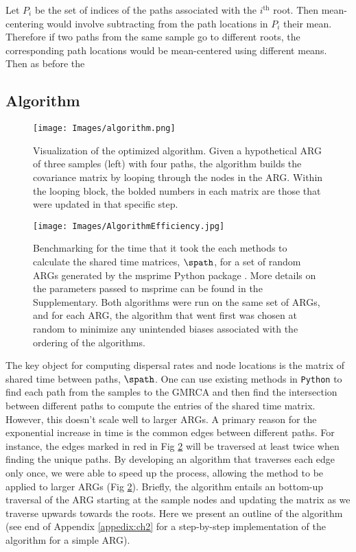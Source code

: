 Let $P_i$ be the set of indices of the paths associated with the $i^\text{th}$ root. Then mean-centering would involve subtracting from the path locations in $P_i$ their mean. Therefore if two paths from the same sample go to different roots, the corresponding path locations would be mean-centered using different means. Then as before the 


 
\subsection{Algorithm}

\begin{figure}[htp]
    \centering
    \texttt{[image: Images/algorithm.png]}
    \caption{Visualization of the optimized algorithm. Given a hypothetical ARG of three samples (left) with four paths, the algorithm builds the covariance matrix by looping through the nodes in the ARG. Within the looping block, the bolded numbers in each matrix are those that were updated in that specific step.}
    \label{fig:algorithm}
\end{figure}


\begin{figure}[h]
    \centering
    \texttt{[image: Images/AlgorithmEfficiency.jpg]}
    \caption{Benchmarking for the time that it took the each methods to calculate the shared time matrices, $\spath$, for a set of random ARGs generated by the msprime Python package \citep{Baumdicker2022}. More details on the parameters passed to msprime can be found in the Supplementary. Both algorithms were run on the same set of ARGs, and for each ARG, the algorithm that went first was chosen at random to minimize any unintended biases associated with the ordering of the algorithms.}
    \label{fig:AlgorithmEff}
\end{figure}

The key object for computing dispersal rates and node locations is the matrix of shared time between paths, $\spath$. One can use existing methods in {\tt Python} to find each path from the samples to the GMRCA and then find the intersection between different paths to compute the entries of the shared time matrix. However, this doesn't scale well to larger ARGs. A primary reason for the exponential increase in time is the common edges between different paths. For instance, the edges marked in red in Fig \ref{fig:AlgorithmEff} will be traversed at least twice when finding the unique paths. By developing an algorithm that traverses each edge only once, we were able to speed up the process, allowing the method to be applied to larger ARGs (Fig \ref{fig:AlgorithmEff}). Briefly, the algorithm entails an bottom-up traversal of the ARG starting at the sample nodes and updating the matrix as we traverse upwards towards the roots. Here we present an outline of the algorithm (see end of Appendix \ref{appedix:ch2} for a step-by-step implementation of the algorithm for a simple ARG). 

